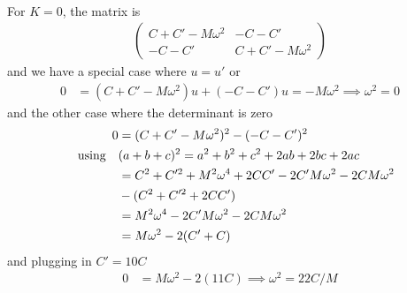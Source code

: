\documentclass[../main.tex]{subfiles}
\begin{document}
\paragraph*{} For $K = 0$, the matrix is
\begin{align*}
    \begin{pmatrix}
        C + C' - M\omega^2 & -C - C' \\
        -C - C' & C + C' - M\omega^2
    \end{pmatrix}
\end{align*}
and we have a special case where $u = u'$ or
\begin{align*}
    0 &= (C + C' - M\omega^2)u + (-C - C')u = -M \omega^2  \implies \omega^2 = 0 
\end{align*}
and the other case where the determinant is zero
\begin{align*}
    0 &= (C + C' - M\omega^2)^2 - (-C - C')^2 \\
    \qusing &(a + b + c)^2 = a^2 + b^2 + c^2 + 2ab + 2bc + 2ac \\
    &= C^2 + C'^2 + M^2\omega^4 + 2CC' - 2C'M\omega^2 - 2CM\omega^2 \\
    &- (C^2 + C'^2 + 2CC') \\
    &= M^2\omega^4 - 2C'M\omega^2 - 2CM\omega^2 \\
    &= M\omega^2 - 2(C' + C)
\end{align*}
and plugging in $C' = 10C$
\begin{align*}
    0 &= M\omega^2 - 2(11C) \implies \omega^2 = 22C/M
\end{align*}
\end{document}
